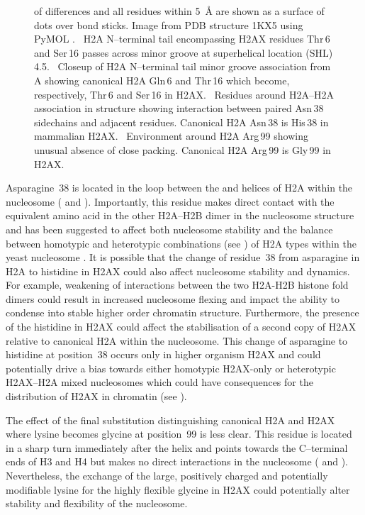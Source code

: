 \begin{figure}
{of differences and all residues within \SI{5}{\angstrom} are shown as a surface of dots over bond sticks. Image
from PDB structure 1KX5 using PyMOL \protect\citep{DeL02}. ~H2A N--terminal tail encompassing H2AX
residues Thr\,6 and Ser\,16 passes across minor groove at superhelical location (SHL) 4.5\@. ~Closeup
of H2A N--terminal tail minor groove association from A showing canonical H2A Gln\,6 and Thr\,16 which
become, respectively, Thr\,6 and Ser\,16 in H2AX\@. ~Residues around H2A--H2A association in structure
showing interaction between paired Asn\,38 sidechains and adjacent residues. Canonical H2A Asn\,38 is
His\,38 in mammalian H2AX\@. ~Environment around H2A Arg\,99 showing unusual absence of close packing.
Canonical H2A Arg\,99 is Gly\,99 in H2AX.}
\label{fig:h2ax-review:framed}
\end{figure}

Asparagine~38 is located in the loop between the  and  helices of H2A within the
nucleosome ( and ). Importantly, this residue makes
direct contact with the equivalent amino acid in the other H2A--H2B dimer in the nucleosome structure
and has been suggested to affect both nucleosome stability and the balance between homotypic and
heterotypic combinations (see ) of H2A types within the yeast
nucleosome \citep{CLW01}. It is possible that the change of residue~38 from asparagine in H2A to
histidine in H2AX could also affect nucleosome stability and dynamics. For example, weakening of
interactions between the two H2A-H2B histone fold dimers could result in increased nucleosome
flexing and impact the ability to condense into stable higher order chromatin structure. Furthermore,
the presence of the histidine in H2AX could affect the stabilisation of a second copy of H2AX
relative to canonical H2A within the nucleosome. This change of asparagine to histidine at
position~38 occurs only in higher organism H2AX and could potentially drive a bias towards either
homotypic H2AX-only or heterotypic H2AX--H2A mixed nucleosomes which could have consequences for the
distribution of H2AX in chromatin (see ).

The effect of the final substitution distinguishing canonical H2A and H2AX where lysine becomes
glycine at position~99 is less clear. This residue is located in a sharp turn immediately after
the  helix and points towards the C--terminal ends of H3 and H4 but makes no direct
interactions in the nucleosome ( and ). Nevertheless,
the exchange of the large, positively charged and potentially modifiable lysine for the highly
flexible glycine in H2AX could potentially alter stability and flexibility of the nucleosome.

